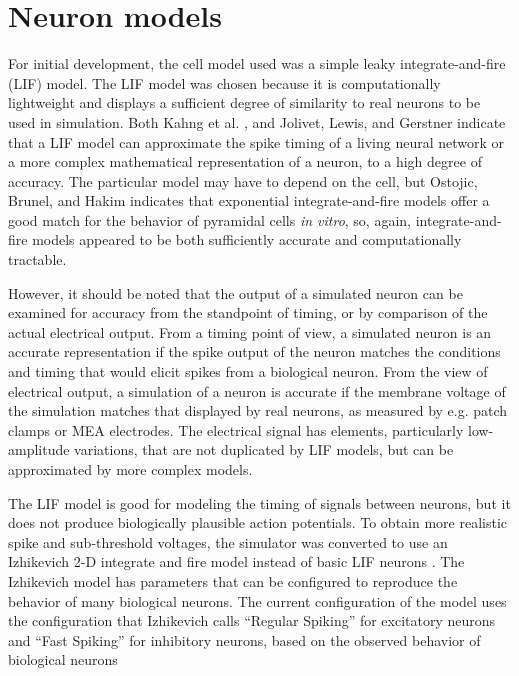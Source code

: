 \documentclass[letterpaper]{article}
\begin{document}
\section{Neuron models}

For initial development, the cell model used was a simple leaky integrate-and-fire (LIF) model. 
The LIF model was chosen because it is computationally lightweight and displays a sufficient degree of similarity to real neurons to be used in simulation. 
Both Kahng et al. \citeyear{kahng2007stochastic}, and Jolivet, Lewis, and Gerstner \citeyear{jolivet2004generalized} indicate that a LIF model can approximate the spike timing of a living neural network or a more complex mathematical representation of a neuron, to a high degree of accuracy. 
The particular model may have to depend on the cell, but Ostojic, Brunel, and Hakim \citeyear{ostojic2009connectivity} indicates that exponential integrate-and-fire models offer a good match for the behavior of pyramidal cells \emph{in vitro}, so, again, integrate-and-fire models appeared to be both sufficiently accurate and computationally tractable. 

However, it should be noted that the output of a simulated neuron can be examined for accuracy from the standpoint of timing, or by comparison of the actual electrical output. 
From a timing point of view, a simulated neuron is an accurate representation if the spike output of the neuron matches the conditions and timing that would elicit spikes from a biological neuron. 
From the view of electrical output, a simulation of a neuron is accurate if the membrane voltage of the simulation matches that displayed by real neurons, as measured by e.g. patch clamps or MEA electrodes. 
The electrical signal has elements, particularly low-amplitude variations, that are not duplicated by LIF models, but can be approximated by more complex models. 

The LIF model is good for modeling the timing of signals between neurons, but it does not produce biologically plausible action potentials. 
To obtain more realistic spike and sub-threshold voltages, the simulator was converted to use an Izhikevich 2-D integrate and fire model instead of basic LIF neurons \cite{izhikevich2003simple}.
The Izhikevich model has parameters that can be configured to reproduce the behavior of many biological neurons. 
The current configuration of the model uses the configuration that Izhikevich calls ``Regular Spiking'' for excitatory neurons and ``Fast Spiking'' for inhibitory neurons, based on the observed behavior of biological neurons \cite{Izhikevich01082004}
\end{document}
